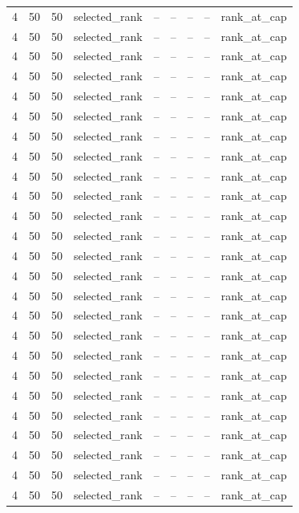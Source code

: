 \begin{longtable}{lllllllll}
4 & 50 & 50 & selected\_rank & -- & -- & -- & -- & rank\_at\_cap \\
4 & 50 & 50 & selected\_rank & -- & -- & -- & -- & rank\_at\_cap \\
4 & 50 & 50 & selected\_rank & -- & -- & -- & -- & rank\_at\_cap \\
4 & 50 & 50 & selected\_rank & -- & -- & -- & -- & rank\_at\_cap \\
4 & 50 & 50 & selected\_rank & -- & -- & -- & -- & rank\_at\_cap \\
4 & 50 & 50 & selected\_rank & -- & -- & -- & -- & rank\_at\_cap \\
4 & 50 & 50 & selected\_rank & -- & -- & -- & -- & rank\_at\_cap \\
4 & 50 & 50 & selected\_rank & -- & -- & -- & -- & rank\_at\_cap \\
4 & 50 & 50 & selected\_rank & -- & -- & -- & -- & rank\_at\_cap \\
4 & 50 & 50 & selected\_rank & -- & -- & -- & -- & rank\_at\_cap \\
4 & 50 & 50 & selected\_rank & -- & -- & -- & -- & rank\_at\_cap \\
4 & 50 & 50 & selected\_rank & -- & -- & -- & -- & rank\_at\_cap \\
4 & 50 & 50 & selected\_rank & -- & -- & -- & -- & rank\_at\_cap \\
4 & 50 & 50 & selected\_rank & -- & -- & -- & -- & rank\_at\_cap \\
4 & 50 & 50 & selected\_rank & -- & -- & -- & -- & rank\_at\_cap \\
4 & 50 & 50 & selected\_rank & -- & -- & -- & -- & rank\_at\_cap \\
4 & 50 & 50 & selected\_rank & -- & -- & -- & -- & rank\_at\_cap \\
4 & 50 & 50 & selected\_rank & -- & -- & -- & -- & rank\_at\_cap \\
4 & 50 & 50 & selected\_rank & -- & -- & -- & -- & rank\_at\_cap \\
4 & 50 & 50 & selected\_rank & -- & -- & -- & -- & rank\_at\_cap \\
4 & 50 & 50 & selected\_rank & -- & -- & -- & -- & rank\_at\_cap \\
4 & 50 & 50 & selected\_rank & -- & -- & -- & -- & rank\_at\_cap \\
4 & 50 & 50 & selected\_rank & -- & -- & -- & -- & rank\_at\_cap \\
4 & 50 & 50 & selected\_rank & -- & -- & -- & -- & rank\_at\_cap \\
4 & 50 & 50 & selected\_rank & -- & -- & -- & -- & rank\_at\_cap \\

\end{longtable}
